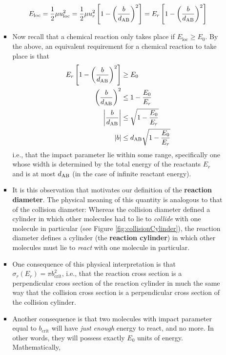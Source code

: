 \documentclass[../notes.tex]{subfiles}
\begin{document}
\begin{itemize}
\begin{itemize}
\begin{itemize}
            \begin{equation*}
                E_\text{loc} = \frac{1}{2}\mu u_\text{loc}^2
                = \frac{1}{2}\mu u_r^2\left[ 1-\left( \frac{b}{d_{\ce{A}\ce{B}}} \right)^2 \right]
                = E_r\left[ 1-\left( \frac{b}{d_{\ce{A}\ce{B}}} \right)^2 \right]
            \end{equation*}
            \item Now recall that a chemical reaction only takes place if $E_\text{loc}\geq E_0$. By the above, an equivalent requirement for a chemical reaction to take place is that
            \begin{align*}
                E_r\left[ 1-\left( \frac{b}{d_{\ce{A}\ce{B}}} \right)^2 \right] &\geq E_0\\
                \left( \frac{b}{d_{\ce{A}\ce{B}}} \right)^2 &\leq 1-\frac{E_0}{E_r}\\
                \left| \frac{b}{d_{\ce{A}\ce{B}}} \right| &\leq \sqrt{1-\frac{E_0}{E_r}}\\
                \left| b \right| &\leq d_{\ce{A}\ce{B}}\sqrt{1-\frac{E_0}{E_r}}
            \end{align*}
            i.e., that the impact parameter lie within some range, specifically one whose width is determined by the total energy of the reactants $E_r$ and is at most $d_{\ce{A}\ce{B}}$ (in the case of infinite reactant energy).
            \item It is this observation that motivates our definition of the \textbf{reaction diameter}. The physical meaning of this quantity is analogous to that of the collision diameter: Whereas the collision diameter defined a cylinder in which other molecules had to lie to \emph{collide} with one molecule in particular (see Figure \ref{fig:collisionCylinder}), the reaction diameter defines a cylinder (the \textbf{reaction cylinder}) in which other molecules must lie to \emph{react} with one molecule in particular.
            \item One consequence of this physical interpretation is that $\sigma_r(E_r)=\pi b_\text{crit}^2$, i.e., that the reaction cross section is a perpendicular cross section of the reaction cylinder in much the same way that the collision cross section is a perpendicular cross section of the collision cylinder.
            \item Another consequence is that two molecules with impact parameter equal to $b_\text{crit}$ will have \emph{just enough} energy to react, and no more. In other words, they will possess exactly $E_0$ units of energy. Mathematically,

\end{itemize}
\end{itemize}
\end{itemize}
\end{document}
